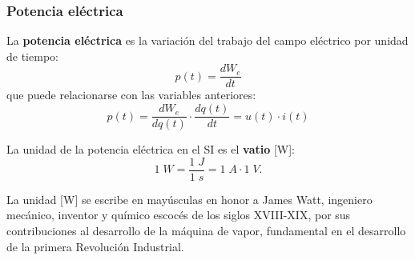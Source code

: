 	\subsubsection{Potencia eléctrica}
	La \textbf{potencia eléctrica} es la variación del trabajo del
        campo eléctrico por unidad de tiempo:
	\begin{equation*}
          p(t)=\frac{dW_{e}}{dt} 
	\end{equation*}
	que puede relacionarse con las variables anteriores:
	\begin{equation*}\label{eq.pvi}
          p(t) = \frac{dW_e}{dq(t)} \cdot \frac{dq(t)}{dt}= u(t)\cdot i(t)
	\end{equation*}
	
	La {unidad} de la potencia eléctrica en el SI es el
        \textbf{vatio} [W]:
	\begin{equation*}
          1\;W = \dfrac{1\;J}{1\;s}= 1\;A\cdot 1\;V.
	\end{equation*}
	\begin{remark}
          La unidad [W] se escribe en mayúsculas en honor a James
          Watt, ingeniero mecánico, inventor y químico escocés de los
          siglos XVIII-XIX, por sus contribuciones al desarrollo de la
          máquina de vapor, fundamental en el desarrollo de la primera
          Revolución Industrial.
	\end{remark}
	
